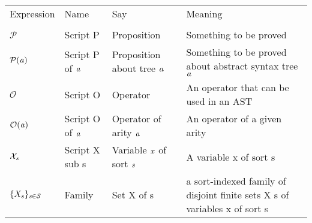 \documentclass[12pt]{article}
\begin{document}
\begin{tabular}[b] {p{} p{} p{} p{}}
Expression & Name & Say & Meaning \\ \\
$\mathcal{P}$ & Script P & Proposition & Something to be proved \\
$\mathcal{P}(\it{a})$ & Script P of $\it{a}$ & Proposition about tree $\it{a}$ & Something to be proved about abstract syntax tree $\it{a}$ \\
$\mathcal{O}$ & Script O & Operator & An operator that can be used in an AST \\
$\mathcal{O}(\it{a})$ & Script O of $\it{a}$ & Operator of arity $\it{a}$ & An operator of a given arity \\
$\mathcal{X}_{\it{s}}$ & Script X sub s & Variable $\it{x}$ of sort $\it{s}$ & A variable x of sort s \\
$\{ X _{s} \} _{\it{s} \in \mathcal{S}}$  & Family & Set X of s & a sort-indexed family of disjoint finite sets X s of variables x of sort s

\end{tabular}
\end{document}
